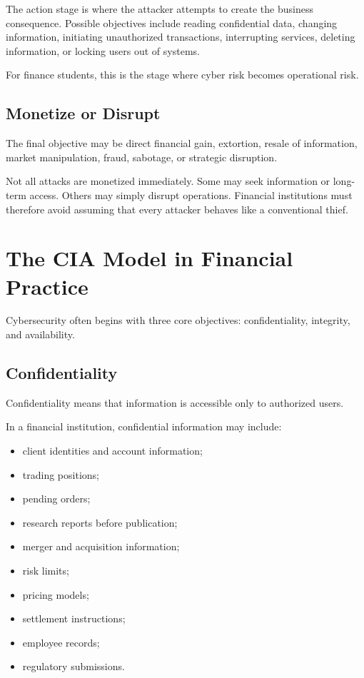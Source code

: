 The action stage is where the attacker attempts to create the business consequence. Possible objectives include reading confidential data, changing information, initiating unauthorized transactions, interrupting services, deleting information, or locking users out of systems.

For finance students, this is the stage where cyber risk becomes operational risk.

\subsection{Monetize or Disrupt}

The final objective may be direct financial gain, extortion, resale of information, market manipulation, fraud, sabotage, or strategic disruption.

Not all attacks are monetized immediately. Some may seek information or long-term access. Others may simply disrupt operations. Financial institutions must therefore avoid assuming that every attacker behaves like a conventional thief.

\section{The CIA Model in Financial Practice}

Cybersecurity often begins with three core objectives: confidentiality, integrity, and availability.

\subsection{Confidentiality}

Confidentiality means that information is accessible only to authorized users.

In a financial institution, confidential information may include:

\begin{itemize}
    \item client identities and account information;
    \item trading positions;
    \item pending orders;
    \item research reports before publication;
    \item merger and acquisition information;
    \item risk limits;
    \item pricing models;
    \item settlement instructions;
    \item employee records;
    \item regulatory submissions.
\end{itemize}

